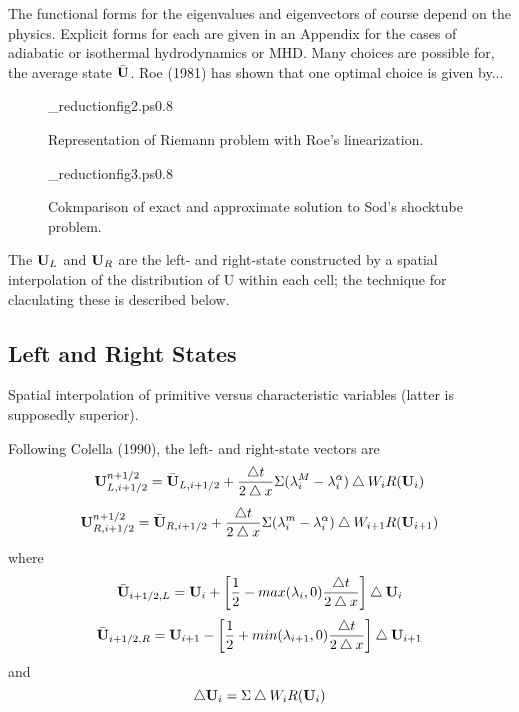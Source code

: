 The functional forms for the eigenvalues and eigenvectors of course
depend on the physics.  Explicit forms for each are given in an Appendix
for the cases of adiabatic or isothermal hydrodynamics or MHD.
Many choices are possible for, the average state $\bar{\bf U}$.  Roe (1981)
has shown that one optimal choice is given by...

\begin{figure}
\plotone_reduction{fig2.ps}{0.8}
\caption{Representation of Riemann problem with Roe's linearization.}
\end{figure}

\begin{figure}
\plotone_reduction{fig3.ps}{0.8}
\caption{Cokmparison of exact and approximate solution to Sod's shocktube
problem.}
\end{figure}

The ${\bf U}_{L}$ and ${\bf U}_{R}$ are the left- and right-state
constructed by a spatial interpolation of the distribution of U within
each cell; the technique for claculating these is described below.

\subsection{Left and Right States}

Spatial interpolation of primitive versus characteristic variables
(latter is supposedly superior).

Following Colella (1990), the left- and right-state vectors are
\begin{equation}
{\bf U}_{L,i+1/2}^{n+1/2} = \bar{\bf U}_{L,i+1/2} + \frac{\bigtriangleup t}{2 \bigtriangleup x}
\Sigma (\lambda_{i}^{M} - \lambda_{i}^{\alpha})
 \bigtriangleup W_{i} R({\bf U}_{i})
\end{equation}
\begin{equation}
{\bf U}_{R,i+1/2}^{n+1/2} = \bar{\bf U}_{R,i+1/2} + \frac{\bigtriangleup t}{2 \bigtriangleup x}
\Sigma (\lambda_{i}^{m} - \lambda_{i}^{\alpha})
 \bigtriangleup W_{i+1} R({\bf U}_{i+1})
\end{equation}
where
\begin{equation}
\bar{\bf U}_{i+1/2,L} = {\bf U}_{i} + \left[ \frac{1}{2} - 
 max (\lambda_{i},0)\frac{\bigtriangleup t}{2 \bigtriangleup x} \right] \bigtriangleup {\bf U}_{i}
\end{equation}
\begin{equation}
\bar{\bf U}_{i+1/2,R} = {\bf U}_{i+1} - \left[ \frac{1}{2} +
 min (\lambda_{i+1},0)\frac{\bigtriangleup t}{2 \bigtriangleup x} \right] \bigtriangleup {\bf U}_{i+1}
\end{equation}
and
\begin{equation}
\bigtriangleup {\bf U}_{i} = \Sigma \bigtriangleup W_{i} R({\bf U}_{i})
\end{equation}

